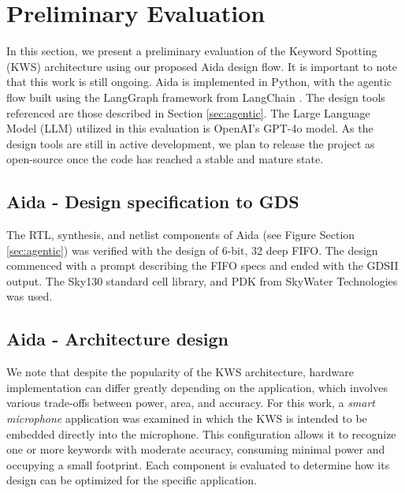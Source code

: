 \section{Preliminary Evaluation}
\label{sec:preliminary_evaluation}
In this section, we present a preliminary evaluation of the Keyword Spotting (KWS) architecture using our proposed Aida design flow. It is important to note that this work is still ongoing. Aida is implemented in Python, with the agentic flow built using the LangGraph framework from LangChain \cite{langgraph}. The design tools referenced are those described in Section \ref{sec:agentic}. The Large Language Model (LLM) utilized in this evaluation is OpenAI's GPT-4o model. As the design tools are still in active development, we plan to release the project as open-source once the code has reached a stable and mature state.

\subsection{Aida - Design specification to GDS}
The RTL, synthesis, and netlist components of Aida (see Figure Section \ref{sec:agentic}) was verified with the design of 6-bit, 32 deep FIFO. The design commenced with a prompt describing the FIFO specs and ended with the GDSII output. The Sky130 standard cell library, and PDK from SkyWater Technologies was used.

\subsection{Aida - Architecture design}

We note that despite the popularity of the KWS architecture, hardware implementation can differ greatly depending on the application, which involves various trade-offs between power, area, and accuracy.
For this work, a \textit{smart microphone } application was examined in which the KWS is intended to be embedded directly into the microphone. This configuration allows it to recognize one or more keywords with moderate accuracy, consuming minimal power and occupying a small footprint. Each component is evaluated to determine how its design can be optimized for the specific application.

